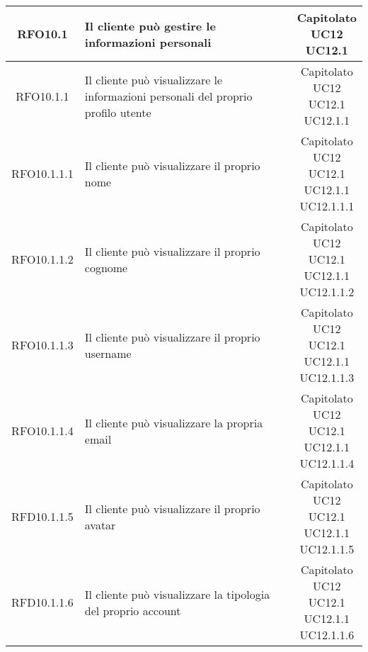 \begin{longtable}{|c|p{8cm}|c|}
\hypertarget{RFO10.1}{RFO10.1} & Il cliente può gestire le informazioni personali & \makecell*{Capitolato\\UC12\\UC12.1} \\
\hline

\hypertarget{RFO10.1.1}{RFO10.1.1} & Il cliente può visualizzare le informazioni personali del proprio profilo utente &\makecell*{Capitolato\\UC12\\UC12.1\\UC12.1.1} \\
\hline

\hypertarget{RFO10.1.1.1}{RFO10.1.1.1} & Il cliente può visualizzare il proprio nome & \makecell*{Capitolato\\UC12\\UC12.1\\UC12.1.1\\UC12.1.1.1} \\
\hline
\hypertarget{RFO10.1.1.2}{RFO10.1.1.2} & Il cliente può visualizzare il proprio cognome & \makecell*{Capitolato\\UC12\\UC12.1\\UC12.1.1\\UC12.1.1.2} \\
\hline
\hypertarget{RFO10.1.1.3}{RFO10.1.1.3} & Il cliente può visualizzare il proprio username & \makecell*{Capitolato\\UC12\\UC12.1\\UC12.1.1\\UC12.1.1.3} \\
\hline
\hypertarget{RFO10.1.1.4}{RFO10.1.1.4} & Il cliente può visualizzare la propria email & \makecell*{Capitolato\\UC12\\UC12.1\\UC12.1.1\\UC12.1.1.4} \\
\hline
\hypertarget{RFD10.1.1.5}{RFD10.1.1.5} & Il cliente può visualizzare il proprio avatar & \makecell*{Capitolato\\UC12\\UC12.1\\UC12.1.1\\UC12.1.1.5} \\
\hline
\hypertarget{RFD10.1.1.6}{RFD10.1.1.6} & Il cliente può visualizzare la tipologia del proprio account & \makecell*{Capitolato\\UC12\\UC12.1\\UC12.1.1\\UC12.1.1.6} \\
\hline


\end{longtable}
